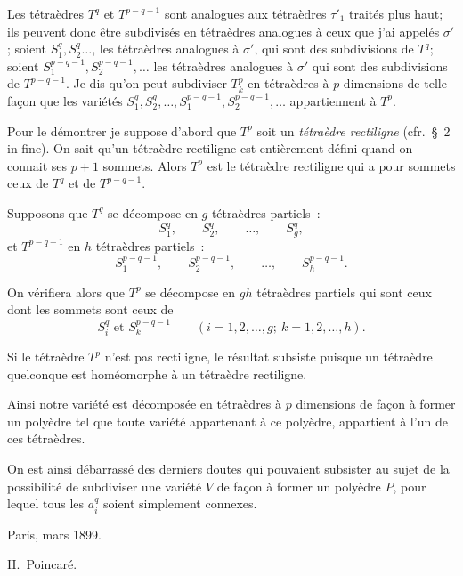 \documentclass{article}
\begin{document}
Les tétraèdres $T^{q}$ et $T^{p-q-1}$ sont analogues aux tétraèdres $\tau'_{1}$ traités plus haut; ils peuvent donc être subdivisés en tétraèdres analogues à ceux que j'ai appelés $\sigma'$; soient $S^{q}_{1}, S^{q}_{2} \ldots$, les tétraèdres analogues à $\sigma'$, qui sont des subdivisions de $T^{q}$; soient $S^{p-q-1}_{1}, S^{p-q-1}_{2}, \ldots$ les tétraèdres analogues à $\sigma'$ qui sont des subdivisions de $T^{p-q-1}$. Je dis qu'on peut subdiviser $T^{p}_{k}$ en tétraèdres à $p$ dimensions de telle façon que les variétés $S^{q}_{1}, S^{q}_{2}, \ldots, S^{p-q-1}_{1}, S^{p-q-1}_{2}, \ldots$ appartiennent à $T^{p}$.

Pour le démontrer je suppose d'abord que $T^{p}$ soit un \emph{tétraèdre rectiligne} (cfr.\ \S~2 in fine). On sait qu'un tétraèdre rectiligne est entièrement défini quand on connait ses $p + 1$ sommets. Alors $T^{p}$ est le tétraèdre rectiligne qui a pour sommets ceux de $T^{q}$ et de $T^{p-q-1}$.

Supposons que $T^{q}$ se décompose en $g$ tétraèdres partiels~:
\[ S^{q}_{1}, \qquad S^{q}_{2}, \qquad \ldots, \qquad S^{q}_{g}, \]
et $T^{p-q-1}$ en $h$ tétraèdres partiels~:
\[ S^{p-q-1}_{1}, \qquad S^{p-q-1}_{2}, \qquad \ldots, \qquad S^{p-q-1}_{h}. \]


On vérifiera alors que $T^{p}$ se décompose en $gh$ tétraèdres partiels qui sont ceux dont les sommets sont ceux de
\[ S^{q}_{i} \text{ et } S^{p-q-1}_{k} \qquad (i = 1, 2, \ldots, g;\ k = 1, 2, \ldots, h). \]

Si le tétraèdre $T^{p}$ n'est pas rectiligne, le résultat subsiste puisque un tétraèdre quelconque est homéomorphe à un tétraèdre rectiligne.

Ainsi notre variété est décomposée en tétraèdres à $p$ dimensions de façon à former un polyèdre tel que toute variété appartenant à ce polyèdre, appartient à l'un de ces tétraèdres.

On est ainsi débarrassé des derniers doutes qui pouvaient subsister au sujet de la possibilité de subdiviser une variété $V$ de façon à former un polyèdre $P$, pour lequel tous les $a^{q}_{i}$ soient simplement connexes.

Paris, mars 1899.

H.~Poincaré.
\end{document}
